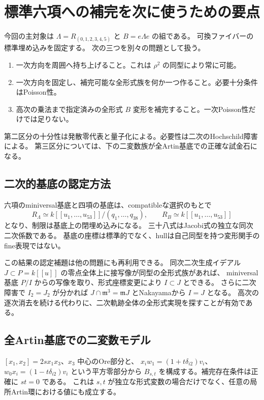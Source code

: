 \section{標準六項への補完を次に使うための要点}

今回の主対象は $\Lambda=R_{(0,1,2,3,4,5)}$ と $B=e\Lambda e$ の組である。
可換ファイバーの標準埋め込みを固定する。
次の三つを別々の問題として扱う。
\begin{enumerate}
\item 一次方向を周囲へ持ち上げること。これは $\rho^2$ の同型により常に可能。
\item 一次方向を固定し、補完可能な全形式族を何か一つ作ること。必要十分条件はPoisson性。
\item 高次の乗法まで指定済みの全形式 $B$ 変形を補完すること。一次Poisson性だけでは足りない。
\end{enumerate}
第二区分の十分性は発散零代表と量子化による。必要性は二次のHochschild障害による。
第三区分については、下の二変数族が全Artin基底での正確な試金石になる。

\subsection{二次的基底の認定方法}
六項のminiversal基底と四項の基底は、compatibleな選択のもとで
\[
 R_\Lambda\simeq k[[u_1,\ldots,u_{53}]]/(q_1,\ldots,q_{38}),\qquad
 R_B\simeq k[[u_1,\ldots,u_{53}]]
\]
となり、制限は基底上の閉埋め込みになる。
三十八式はJacobi式の独立な同次二次係数である。
基底の座標は標準的でなく、hullは自己同型を持つ変形関手のfine表現ではない。

この結果の認定補題は他の問題にも再利用できる。
同次二次生成イデアル $J\subset P=k[[u]]$ の零点全体上に接写像が同型の全形式族があれば、
miniversal基底 $P/I$ からの写像を取り、形式座標変更により $I\subset J$ とできる。
さらに二次障害で $I_2=J_2$ が分かれば
$J\cap\mathfrak m^3=\mathfrak mJ$ とNakayamaから $I=J$ となる。
高次の逐次消去を続ける代わりに、二次軌跡全体の全形式実現を探すことが有効である。

\subsection{全Artin基底での二変数モデル}
$[x_1,x_2]=2s x_1x_3$、$x_3$ 中心のOre部分と、
$x_iw_1=(1+t\delta_{i2})v_i$、$w_0x_i=(1-t\delta_{i2})v_i$ という平方零部分から
$B_{s,t}$ を構成する。補完存在条件は正確に $st=0$ である。
これは $s,t$ が独立な形式変数の場合だけでなく、任意の局所Artin環における値にも成立する。


